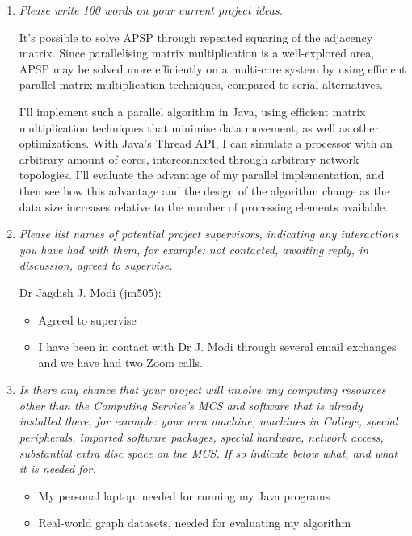 \documentclass{article}
\begin{document}
\begin{enumerate}
    \item \textit{Please write 100 words on your current project ideas.}

         It's possible to solve APSP through repeated squaring of
         the adjacency matrix. Since parallelising matrix multiplication is a
         well-explored area, APSP may be solved more efficiently on a multi-core system
         by using efficient parallel matrix multiplication techniques, compared to
         serial alternatives.

         I'll implement such a parallel algorithm in Java, using efficient
         matrix multiplication techniques that minimise data movement, as well
         as  other optimizations. With Java's Thread API, I can simulate a
         processor with an arbitrary amount of cores, interconnected through
         arbitrary network topologies. I'll evaluate the advantage of my
         parallel implementation, and then see how this advantage and the
         design of the algorithm change as the data size increases relative to
         the number of processing elements available.

     \item \textit{Please list names of potential project supervisors, indicating
             any interactions you have had with them, for example: not
         contacted, awaiting reply, in discussion, agreed to supervise.}

         Dr Jagdish J. Modi (jm505):
         \begin{itemize}
             \item Agreed to supervise
             \item I have been in contact with Dr J. Modi through several email exchanges
                 and we have had two Zoom calls.
         \end{itemize}


\item \textit{Is there any chance that your project will involve any
computing resources other than the Computing Service's MCS and
software that is already installed there, for example: your own
machine, machines in College, special peripherals, imported
software packages, special hardware, network access, substantial
extra disc space on the MCS. If so indicate below what, and what it is needed for.}

\begin{itemize}
    \item My personal laptop, needed for running my Java programs
    \item Real-world graph datasets, needed for evaluating my algorithm
\end{itemize}
\end{enumerate}
\end{document}

